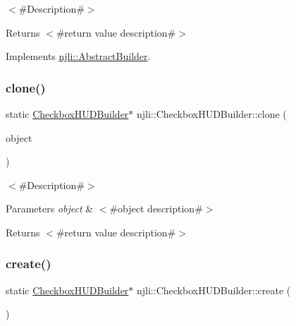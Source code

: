 $<$\#\+Description\#$>$

\begin{DoxyReturn}{Returns}
$<$\#return value description\#$>$ 
\end{DoxyReturn}


Implements \mbox{\hyperlink{classnjli_1_1_abstract_builder_aa1d220053e182c37b31b427499c6eacf}{njli\+::\+Abstract\+Builder}}.

\mbox{\label{classnjli_1_1_checkbox_h_u_d_builder_a7fbcb6e45b8bacf62472a1f0afa5debc}} 
\subsubsection{\texorpdfstring{clone()}{clone()}}
{\footnotesize\ttfamily static \mbox{\hyperlink{classnjli_1_1_checkbox_h_u_d_builder}{Checkbox\+H\+U\+D\+Builder}}$\ast$ njli\+::\+Checkbox\+H\+U\+D\+Builder\+::clone (\begin{DoxyParamCaption}\item[{const \mbox{\hyperlink{classnjli_1_1_checkbox_h_u_d_builder}{Checkbox\+H\+U\+D\+Builder}} \&}]{object }\end{DoxyParamCaption})\hspace{0.3cm}{\ttfamily [static]}}

$<$\#\+Description\#$>$


\begin{DoxyParams}{Parameters}
{\em object} & $<$\#object description\#$>$\\
\hline
\end{DoxyParams}
\begin{DoxyReturn}{Returns}
$<$\#return value description\#$>$ 
\end{DoxyReturn}
\mbox{\label{classnjli_1_1_checkbox_h_u_d_builder_a962c6257a10c98321603022823947ad2}} 
\subsubsection{\texorpdfstring{create()}{create()}}
{\footnotesize\ttfamily static \mbox{\hyperlink{classnjli_1_1_checkbox_h_u_d_builder}{Checkbox\+H\+U\+D\+Builder}}$\ast$ njli\+::\+Checkbox\+H\+U\+D\+Builder\+::create (\begin{DoxyParamCaption}{ }\end{DoxyParamCaption})\hspace{0.3cm}{\ttfamily [static]}}

